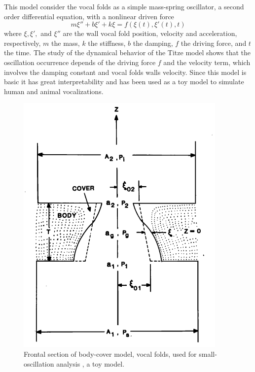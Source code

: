 \begin{minipage}{0.55\linewidth}
This model consider the vocal folds as a simple mass-spring oscillator, a second order differential equation, with a nonlinear driven force 
\begin{equation*}
    m \xi'' + b \xi' +  k\xi = f(\xi(t), \xi'(t), t)
\end{equation*}    
where $\xi, \xi',$ and $\xi''$ are the wall vocal fold position, velocity and acceleration, respectively, $m$ the mass, $k$ the stiffness, $b$ the damping, $f$ the driving force, and $t$ the time. The study of the dynamical behavior of the Titze model shows that the oscillation occurrence depends of the driving force $f$ and the velocity term, which involves the damping constant and vocal folds walls velocity. Since this model is basic it has great interpretability and has been used as a toy model to simulate human and animal vocalizations. 

\end{minipage}\hspace{10pt}
\begin{minipage}{0.4\linewidth}
\begin{figure}[H]
    \centering
    \includegraphics[width=0.9\linewidth]{Images/tatzi.png}
    \caption{Frontal section of body-cover model, vocal folds, used for small-oscillation analysis \cite{Titze1998}, a toy model.}
    \label{fig:titze}
\end{figure}
\end{minipage}

